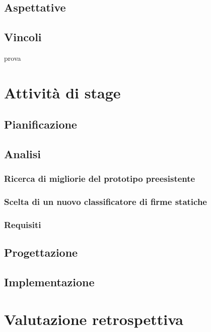 \subsection{Aspettative}
\label{2.3}

\subsection{Vincoli}
\label{2.4}
\gls{prova}

\newpage

\section{Attività di stage}
\label{3.0}

\subsection{Pianificazione}
\label{3.1}

\subsection{Analisi}
\label{3.2}

\subsubsection{Ricerca di migliorie del prototipo preesistente}
\label{3.2.1}

\subsubsection{Scelta di un nuovo classificatore di firme statiche}
\label{3.2.2}

\subsubsection{Requisiti}
\label{3.2.3}

\subsection{Progettazione}
\label{3.3}

\subsection{Implementazione}
\label{3.4}
\newpage

\section{Valutazione retrospettiva}
\label{4.0}

